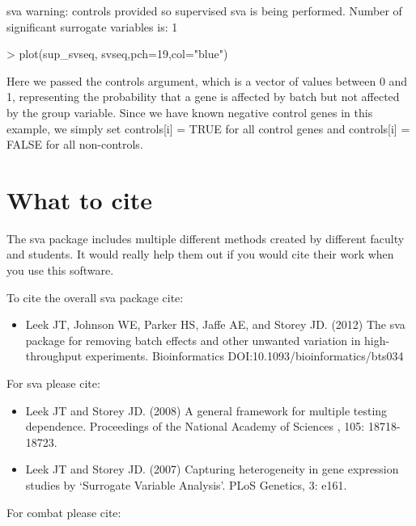 \documentclass[12pt]{article}
\begin{document}
\begin{Schunk}
\begin{Soutput}
sva warning: controls provided so supervised sva is being performed.
Number of significant surrogate variables is:  1 
\end{Soutput}
\begin{Sinput}
> plot(sup_svseq, svseq,pch=19,col="blue")
\end{Sinput}
\end{Schunk}

Here we passed the controls argument, which is a vector of values between 0 and 1, representing the probability that a gene is affected by batch but not affected by the group variable. Since we have known negative control genes in this example, we simply set controls[i] = TRUE for all control genes and controls[i] = FALSE for all non-controls. 

\section{What to cite}

The sva package includes multiple different methods created by different faculty and students. It would really help them out if you would cite their work when you use this software. 

To cite the overall sva package cite: 

\begin{itemize}
\item Leek JT, Johnson WE, Parker HS, Jaffe AE, and Storey JD. (2012) The sva package for removing batch effects and other unwanted variation in high-throughput experiments. Bioinformatics DOI:10.1093/bioinformatics/bts034
\end{itemize}

For sva please cite: 
\begin{itemize}
\item Leek JT and Storey JD. (2008) A general framework for multiple testing dependence. Proceedings of the National Academy of Sciences , 105: 18718-18723. 
\item Leek JT and Storey JD. (2007) Capturing heterogeneity in gene expression studies by `Surrogate Variable Analysis'. PLoS Genetics, 3: e161.
\end{itemize}

For combat please cite: 
\end{document}
